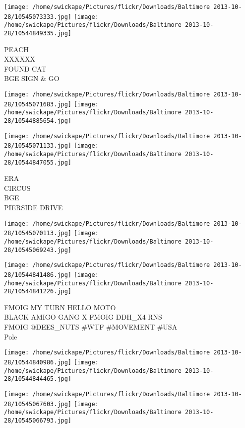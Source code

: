 \documentclass[10pt,letterpaper]{article}
\begin{document}
\texttt{[image: /home/swickape/Pictures/flickr/Downloads/Baltimore 2013-10-28/10545073333.jpg]}
\texttt{[image: /home/swickape/Pictures/flickr/Downloads/Baltimore 2013-10-28/10544849335.jpg]}

PEACH\\
XXXXXX\\
FOUND CAT\\
BGE SIGN \& GO\\
\pagebreak

\texttt{[image: /home/swickape/Pictures/flickr/Downloads/Baltimore 2013-10-28/10545071683.jpg]}
\texttt{[image: /home/swickape/Pictures/flickr/Downloads/Baltimore 2013-10-28/10544885654.jpg]}

\texttt{[image: /home/swickape/Pictures/flickr/Downloads/Baltimore 2013-10-28/10545071133.jpg]}
\texttt{[image: /home/swickape/Pictures/flickr/Downloads/Baltimore 2013-10-28/10544847055.jpg]}

ERA\\
CIRCUS\\
BGE\\
PIERSIDE DRIVE\\
\pagebreak

\texttt{[image: /home/swickape/Pictures/flickr/Downloads/Baltimore 2013-10-28/10545070113.jpg]}
\texttt{[image: /home/swickape/Pictures/flickr/Downloads/Baltimore 2013-10-28/10545069243.jpg]}

\texttt{[image: /home/swickape/Pictures/flickr/Downloads/Baltimore 2013-10-28/10544841486.jpg]}
\texttt{[image: /home/swickape/Pictures/flickr/Downloads/Baltimore 2013-10-28/10544841226.jpg]}

FMOIG MY TURN HELLO MOTO\\
BLACK AMIGO GANG X FMOIG DDH\_X4 RNS\\
FMOIG @DEES\_NUTS \#WTF \#MOVEMENT \#USA\\
Pole\\
\pagebreak

\texttt{[image: /home/swickape/Pictures/flickr/Downloads/Baltimore 2013-10-28/10544840986.jpg]}
\texttt{[image: /home/swickape/Pictures/flickr/Downloads/Baltimore 2013-10-28/10544844465.jpg]}

\texttt{[image: /home/swickape/Pictures/flickr/Downloads/Baltimore 2013-10-28/10545067603.jpg]}
\texttt{[image: /home/swickape/Pictures/flickr/Downloads/Baltimore 2013-10-28/10545066793.jpg]}
\end{document}

